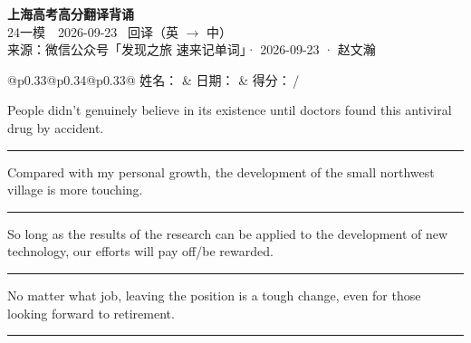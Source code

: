 \documentclass[11pt,a4paper]{article}
\newcommand{\num}[1]{\makebox[1.9em][r]{#1.}\hspace{0.3em}}
\newcommand{\wline}{\noindent\rule{\linewidth}{0.4pt}}
\begin{document}
\pagestyle{plain}
\begin{center}
{\LARGE\bfseries 上海高考高分翻译背诵 }\\[0.25em]
{\large 24一模　2026-09-23 \quad\ 回译（英 $\to$ 中）}\\[0.35em]
{\footnotesize 来源：微信公众号「发现之旅 速来记单词」· 2026-09-23 · 赵文瀚}
\end{center}

\vspace{0.4em}
\noindent\begin{tabular}{@{}p{0.33\textwidth}@{}p{0.34\textwidth}@{}p{0.33\textwidth}@{}}
姓名：\underline{\hspace{2.0cm}} & 日期：\underline{\hspace{2.0cm}} & 得分：\underline{\hspace{1.4cm}}\,/ \\
\end{tabular}

\vspace{0.5em}

\vspace{0.8em}
\num{1}People didn’t genuinely believe in its existence until doctors found this antiviral drug by accident.

\vspace{0.25em}

\wline

\num{2}Compared with my personal growth, the development of the small northwest village is more touching.

\vspace{0.25em}

\wline

\num{3}So long as the results of the research can be applied to the development of new technology, our efforts will pay off/be rewarded.

\vspace{0.25em}

\wline

\num{4}No matter what job, leaving the position is a tough change, even for those looking forward to retirement.

\vspace{0.25em}

\wline
\end{document}
